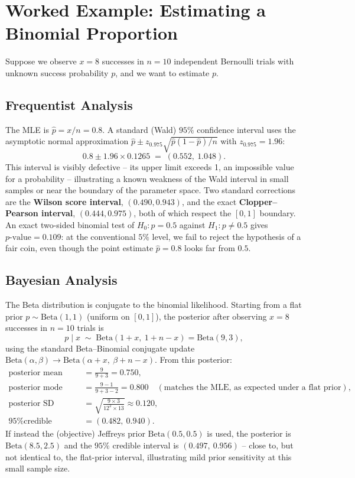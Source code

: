 \documentclass[11pt,a4paper]{article}
\begin{document}
\section{Worked Example: Estimating a Binomial Proportion}
Suppose we observe $x = 8$ successes in $n = 10$ independent Bernoulli trials with unknown success probability $p$, and we want to estimate $p$.

\subsection{Frequentist Analysis}
The MLE is $\hat p = x/n = 0.8$. A standard (Wald) $95\%$ confidence interval uses the asymptotic normal approximation $\hat p \pm z_{0.975}\sqrt{\hat p(1-\hat p)/n}$ with $z_{0.975}=1.96$:
\begin{equation}
0.8 \pm 1.96 \times 0.1265 \;=\; (0.552,\ 1.048).
\end{equation}
This interval is visibly defective -- its upper limit exceeds 1, an impossible value for a probability -- illustrating a known weakness of the Wald interval in small samples or near the boundary of the parameter space. Two standard corrections are the \textbf{Wilson score interval}, $(0.490, 0.943)$, and the exact \textbf{Clopper--Pearson interval}, $(0.444, 0.975)$, both of which respect the $[0,1]$ boundary. An exact two-sided binomial test of $H_0: p = 0.5$ against $H_1: p \ne 0.5$ gives $p\text{-value} = 0.109$: at the conventional $5\%$ level, we fail to reject the hypothesis of a fair coin, even though the point estimate $\hat p = 0.8$ looks far from $0.5$.

\subsection{Bayesian Analysis}
The Beta distribution is conjugate to the binomial likelihood. Starting from a flat prior $p \sim \text{Beta}(1,1)$ (uniform on $[0,1]$), the posterior after observing $x=8$ successes in $n=10$ trials is
\begin{equation}
p \mid x \;\sim\; \text{Beta}(1+x,\ 1+n-x) = \text{Beta}(9, 3),
\end{equation}
using the standard Beta--Binomial conjugate update $\text{Beta}(\alpha,\beta) \to \text{Beta}(\alpha+x,\ \beta+n-x)$. From this posterior:
\begin{align}
\text{posterior mean} &= \frac{9}{9+3} = 0.750, \\
\text{posterior mode (MAP)} &= \frac{9-1}{9+3-2} = 0.800 \quad (\text{matches the MLE, as expected under a flat prior}), \\
\text{posterior SD} &= \sqrt{\frac{9 \times 3}{12^2 \times 13}} \approx 0.120, \\
\text{95\% credible interval} &= (0.482,\ 0.940).
\end{align}
If instead the (objective) Jeffreys prior $\text{Beta}(0.5, 0.5)$ is used, the posterior is $\text{Beta}(8.5, 2.5)$ and the $95\%$ credible interval is $(0.497,\ 0.956)$ -- close to, but not identical to, the flat-prior interval, illustrating mild prior sensitivity at this small sample size.
\end{document}

